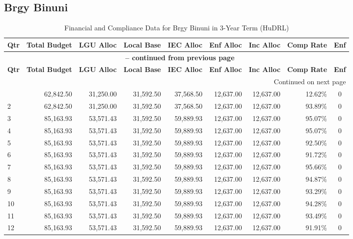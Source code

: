 \subsection{Brgy Binuni}
\begin{longtable}{lrrrrrrrc}
\caption{Financial and Compliance Data for Brgy Binuni in 3-Year Term (HuDRL)} \\
\toprule
\textbf{Qtr} & \textbf{Total Budget} & \textbf{LGU Alloc} & \textbf{Local Base} & \textbf{IEC Alloc} & \textbf{Enf Alloc} & \textbf{Inc Alloc} & \textbf{Comp Rate} & \textbf{Enf} \\
\midrule
\endfirsthead
\multicolumn{9}{c}{{\bfseries \tablename\ \thetable{} -- continued from previous page}} \\
\toprule
\textbf{Qtr} & \textbf{Total Budget} & \textbf{LGU Alloc} & \textbf{Local Base} & \textbf{IEC Alloc} & \textbf{Enf Alloc} & \textbf{Inc Alloc} & \textbf{Comp Rate} & \textbf{Enf} \\
\midrule
\endhead
\hline \multicolumn{9}{r}{{Continued on next page}} \\ \hline
\endfoot
\bottomrule
\endlastfoot
1 & 62,842.50 & 31,250.00 & 31,592.50 & 37,568.50 & 12,637.00 & 12,637.00 & 12.62\% & 0 \\
2 & 62,842.50 & 31,250.00 & 31,592.50 & 37,568.50 & 12,637.00 & 12,637.00 & 93.89\% & 0 \\
3 & 85,163.93 & 53,571.43 & 31,592.50 & 59,889.93 & 12,637.00 & 12,637.00 & 95.07\% & 0 \\
4 & 85,163.93 & 53,571.43 & 31,592.50 & 59,889.93 & 12,637.00 & 12,637.00 & 95.07\% & 0 \\
5 & 85,163.93 & 53,571.43 & 31,592.50 & 59,889.93 & 12,637.00 & 12,637.00 & 92.50\% & 0 \\
6 & 85,163.93 & 53,571.43 & 31,592.50 & 59,889.93 & 12,637.00 & 12,637.00 & 91.72\% & 0 \\
7 & 85,163.93 & 53,571.43 & 31,592.50 & 59,889.93 & 12,637.00 & 12,637.00 & 95.66\% & 0 \\
8 & 85,163.93 & 53,571.43 & 31,592.50 & 59,889.93 & 12,637.00 & 12,637.00 & 94.87\% & 0 \\
9 & 85,163.93 & 53,571.43 & 31,592.50 & 59,889.93 & 12,637.00 & 12,637.00 & 93.29\% & 0 \\
10 & 85,163.93 & 53,571.43 & 31,592.50 & 59,889.93 & 12,637.00 & 12,637.00 & 94.28\% & 0 \\
11 & 85,163.93 & 53,571.43 & 31,592.50 & 59,889.93 & 12,637.00 & 12,637.00 & 93.49\% & 0 \\
12 & 85,163.93 & 53,571.43 & 31,592.50 & 59,889.93 & 12,637.00 & 12,637.00 & 91.91\% & 0 \\
\end{longtable}
\newpage

